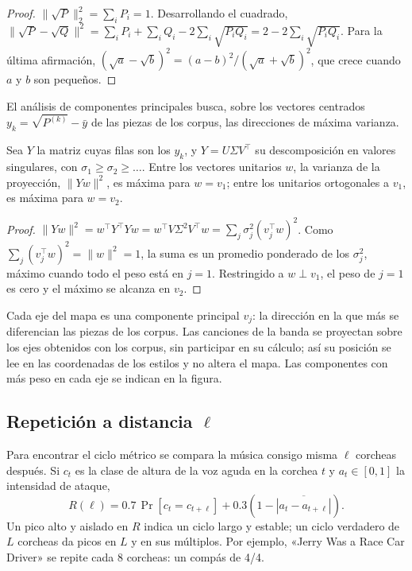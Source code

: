 \begin{proof}
$\|\sqrt{P}\|_2^2 = \sum_i P_i = 1$. Desarrollando el cuadrado,
$\|\sqrt{P} - \sqrt{Q}\|^2 = \sum_i P_i + \sum_i Q_i - 2 \sum_i \sqrt{P_i Q_i} = 2 - 2 \sum_i \sqrt{P_i Q_i}$. Para la
última afirmación, $(\sqrt{a} - \sqrt{b})^2 = (a - b)^2 / (\sqrt a + \sqrt b)^2$, que crece cuando $a$ y $b$ son pequeños.
\end{proof}

El análisis de componentes principales busca, sobre los vectores centrados $y_k = \sqrt{P^{(k)}} - \bar y$ de las piezas de
los corpus, las direcciones de máxima varianza.

\begin{proposicion}\label{prop:pca}
Sea $Y$ la matriz cuyas filas son los $y_k$, y $Y = U \Sigma V^{\top}$ su descomposición en valores singulares, con
$\sigma_1 \ge \sigma_2 \ge \dots$. Entre los vectores unitarios $w$, la varianza de la proyección, $\|Yw\|^2$, es máxima
para $w = v_1$; entre los unitarios ortogonales a $v_1$, es máxima para $w = v_2$.
\end{proposicion}

\begin{proof}
$\|Yw\|^2 = w^{\top} Y^{\top} Y w = w^{\top} V \Sigma^2 V^{\top} w = \sum_j \sigma_j^2 (v_j^{\top} w)^2$. Como
$\sum_j (v_j^{\top} w)^2 = \|w\|^2 = 1$, la suma es un promedio ponderado de los $\sigma_j^2$, máximo cuando todo el peso
está en $j = 1$. Restringido a $w \perp v_1$, el peso de $j = 1$ es cero y el máximo se alcanza en $v_2$.
\end{proof}

Cada eje del mapa es una componente principal $v_j$: la dirección en la que más se diferencian las piezas de los corpus.
Las canciones de la banda se proyectan sobre los ejes obtenidos con los corpus, sin participar en su cálculo; así su
posición se lee en las coordenadas de los estilos y no altera el mapa. Las componentes con más peso en cada eje se
indican en la figura.

\subsection{Repetición a distancia \texorpdfstring{$\ell$}{l}}

Para encontrar el ciclo métrico se compara la música consigo misma $\ell$ corcheas después. Si $c_t$ es la clase de
altura de la voz aguda en la corchea $t$ y $a_t \in [0,1]$ la intensidad de ataque,
\[
  R(\ell) = 0.7\, \Pr\!\left[c_t = c_{t+\ell}\right] + 0.3 \left(1 - \overline{|a_t - a_{t+\ell}|}\right).
\]
Un pico alto y aislado en $R$ indica un ciclo largo y estable; un ciclo verdadero de $L$ corcheas da picos en $L$ y en
sus múltiplos. Por ejemplo, «Jerry Was a Race Car Driver» se repite cada 8 corcheas: un compás de 4/4.

